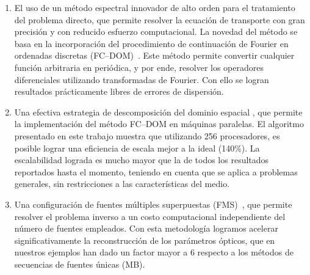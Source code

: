 \begin{enumerate}
\item El uso de un método espectral innovador de alto orden
para el tratamiento del problema directo, que permite resolver la 
ecuación de transporte con gran precisión y con reducido esfuerzo 
computacional. La novedad del método se basa en la incorporación 
del procedimiento de continuación de Fourier 
en ordenadas discretas (FC--DOM)~\cite{Gaggioli2019}. 
Este método permite convertir cualquier función arbitraria en periódica, y 
por ende, resolver los operadores diferenciales utilizando transformadas 
de Fourier. Con ello se logran resultados prácticamente libres de 
errores de dispersión.

\item Una efectiva estrategia de descomposición del dominio espacial 
\cite{Gaggioli2022}, 
que permite la implementación del método FC--DOM en máquinas paralelas. 
El algoritmo presentado en este trabajo muestra que utilizando 
256 procesadores, es posible lograr una eficiencia de escala 
mejor a la ideal (140\%). 
La escalabilidad lograda es mucho mayor que la de todos los 
resultados reportados hasta el momento, teniendo en cuenta que 
se aplica a problemas generales, sin restricciones a las 
características del medio.

\item Una configuración de fuentes múltiples superpuestas (FMS)~\cite{Gaggioli2022}, 
que permite resolver el problema inverso a un costo computacional 
independiente del número de fuentes empleados. 
Con esta metodología logramos acelerar significativamente la reconstrucción 
de los parámetros ópticos, que en nuestros ejemplos han dado un factor mayor a 6 
respecto a los métodos de secuencias de fuentes únicas (MB).

\end{enumerate}

